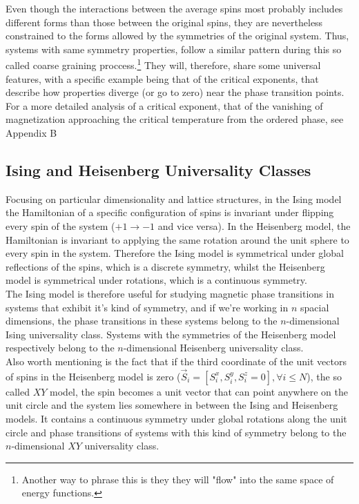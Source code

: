 \documentclass[../intro.tex,../../main.tex]{subfiles}
\begin{document}
Even though the interactions between the average spins most probably includes different forms than those between the original spins, they are nevertheless constrained to the forms allowed by the symmetries of the original system. Thus, systems with same symmetry properties, follow a similar pattern during this so called coarse graining proccess.\footnote{Another way to phrase this is they they will "flow" into the same space of energy functions.} They will, therefore, share some universal features, with a specific example being that of the critical exponents, that describe how properties diverge (or go to zero) near the phase transition points. For a more detailed analysis of a critical exponent, that of the vanishing of magnetization approaching the critical temperature from the ordered phase, see Appendix B

\subsection{Ising and Heisenberg Universality Classes}

\hspace{\parindent} Focusing on particular dimensionality and lattice structures, in the Ising model the Hamiltonian of a specific configuration of spins is invariant under flipping every spin of the system ($+1\rightarrow-1$ and vice versa). In the Heisenberg model, the Hamiltonian is invariant to applying the same rotation around the unit sphere to every spin in the system. Therefore the Ising model is symmetrical under global reflections of the spins, which is a discrete symmetry, whilst the Heisenberg model is symmetrical under rotations, which is a continuous symmetry.\\

The Ising model is therefore useful for studying magnetic phase transitions in systems that exhibit it's kind of symmetry, and if we're working in $n$ spacial dimensions, the phase transitions in these systems belong to the $n$-dimensional Ising universality class. Systems with the symmetries of the Heisenberg model respectively belong to the $n$-dimensional Heisenberg universality class.\\

Also worth mentioning is the fact that if the third coordinate of the unit vectors of spins in the Heisenberg model is zero ($\vec{S}_{i}=[S^{x}_{i}, S^{y}_{i}, S^{z}_{i}=0], \forall i\le N$), the so called $XY$ model, the spin becomes a unit vector that can point anywhere on the unit circle and the system lies somewhere in between the Ising and Heisenberg models. It contains a continuous symmetry under global rotations along the unit circle and phase transitions of systems with this kind of symmetry belong to the $n$-dimensional $XY$ universality class.
\end{document}
